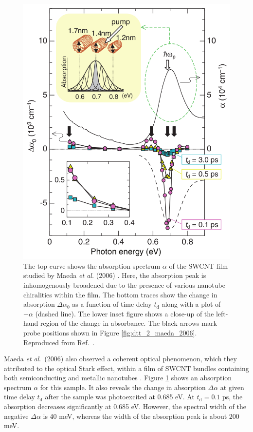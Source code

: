 \begin{figure}[ht]
	\centering
	\includegraphics[scale=0.35]{images/chapter_prior_works/stark_shift_maeda}
	\caption{The top curve shows the absorption spectrum $\alpha$ of the SWCNT film studied by Maeda \textit{et al.} (2006) \cite{maeda2006gigantic}. Here, the absorption peak is inhomogenously broadened due to the presence of various nanotube chiralities within the film. The bottom traces show the change in absorption $\Delta \alpha_0$ as a function of time delay $t_\text{d}$ along with a plot of $-\alpha$ (dashed line). The lower inset figure shows a close-up of the left-hand region of the change in absorbance. The black arrows mark probe positions shown in Figure \ref{fig:dtt_2_maeda_2006}. Reproduced from Ref.\ \cite{maeda2006gigantic}.}
	\label{fig:abs_maeda_2006}
\end{figure}



Maeda \textit{et al}.\ (2006) also observed a coherent optical phenomenon, which they attributed to the optical Stark effect, within a film of SWCNT bundles containing both semiconducting and metallic nanotubes \cite{maeda2006gigantic}. Figure \ref{fig:abs_maeda_2006} shows an absorption spectrum $\alpha$ for this sample. It also reveals the change in absorption $\Delta \alpha$ at given time delay $t_\text{d}$ after the sample was photoexcited at 0.685 eV. At $t_\text{d} = 0.1$ ps, the absorption decreases significantly at 0.685 eV. However, the spectral width of the negative $\Delta\alpha$ is 40 meV, whereas the width of the absorption peak is about 200 meV.

